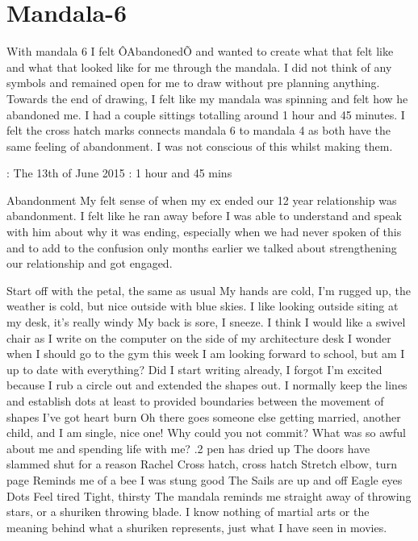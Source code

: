 \chapter{Mandala-6}




With mandala 6 I felt ÔAbandonedÕ and wanted to create what that felt like and what that looked like for me through the mandala. I did not think of any symbols and remained open for me to draw without pre planning anything. Towards the end of drawing, I felt like my mandala was spinning and felt how he abandoned me. I had a couple sittings totalling around 1 hour and 45 minutes. I felt the cross hatch marks connects mandala 6 to mandala 4 as both have the same feeling of abandonment. I was not conscious of this whilst making them. 

\Date: The 13th of June 2015
\Total: 1 hour and 45 mins

Abandonment
My felt sense of when my ex ended our 12 year relationship was abandonment. I felt like he ran away before I was able to understand and speak with him about why it was ending, especially when we had never spoken of this and to add to the confusion only months earlier we talked about strengthening our relationship and got engaged.  

Start off with the petal, the same as usual 
My hands are cold, I'm rugged up, the weather is cold, but nice outside with blue skies. I like looking outside siting at my desk, it's really windy
My back is sore, I sneeze. I think I would like a swivel chair as I write on the computer on the side of my architecture desk
I wonder when I should go to the gym this week
I am looking forward to school, but am I up to date with everything?
Did I start writing already, I forgot
I'm excited because I rub a circle out and extended the shapes out. I normally keep the lines and establish dots at least to provided boundaries between the movement of shapes 
I've got heart burn
Oh there goes someone else getting married, another child, and I am single, nice one! 
Why could you not commit? What was so awful about me and spending life with me?
.2 pen has dried up
The doors have slammed shut for a reason Rachel
Cross hatch, cross hatch 
Stretch elbow, turn page 
Reminds me of a bee
I was stung good
The Sails are up and off 
Eagle eyes 
Dots
Feel tired 
Tight, thirsty 
The mandala reminds me straight away of throwing stars, or a shuriken throwing blade. I know nothing of martial arts or the meaning behind what a shuriken represents, just what I have seen in movies. 

